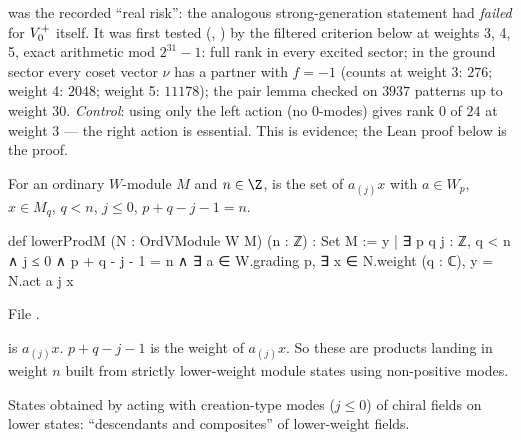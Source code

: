 \begin{warning}[title={Evidence: Numerical de-risking before formalisation}]
 was the recorded ``real risk'': the analogous strong-generation statement had
\emph{failed} for $V_0^{+}$ itself.  It was first tested (,
) by the filtered criterion below at weights 3, 4, 5, exact
arithmetic mod $2^{31}-1$: full rank in every excited sector; in the ground sector every coset vector
$\nu$ has a partner with $f=-1$ (counts at weight 3: $276$; weight 4: $2048$; weight 5: $11178$); the pair
lemma checked on $3937$ patterns up to weight $30$.  \emph{Control}: using only the left action
(no $0$-modes) gives rank $0$ of $24$ at weight $3$ — the right action is essential.  This is evidence;
the Lean proof below is the proof.
\end{warning}

\begin{definition}\label{ch14:def:lowerprod}
For an ordinary $W$-module $M$ and $n\in\Z$,  is the set of $a_{(j)}x$ with $a\in W_p$,
$x\in M_q$, $q<n$, $j\le0$, $p+q-j-1=n$.
\end{definition}
\begin{leancode}
def lowerProdM (N : OrdVModule W M) (n : ℤ) : Set M :=
  {y | ∃ p q j : ℤ, q < n ∧ j ≤ 0 ∧ p + q - j - 1 = n ∧
    ∃ a ∈ W.grading p, ∃ x ∈ N.weight (q : ℂ), y = N.act a j x}
\end{leancode}
File .

\begin{dictionary}
 is $a_{(j)}x$.  $p+q-j-1$ is the weight of $a_{(j)}x$.  So these are products landing in
weight $n$ built from strictly lower-weight module states using non-positive modes.
\end{dictionary}

\begin{physics}
States obtained by acting with creation-type modes ($j\le0$) of chiral fields on lower states:
``descendants and composites'' of lower-weight fields.
\end{physics}

